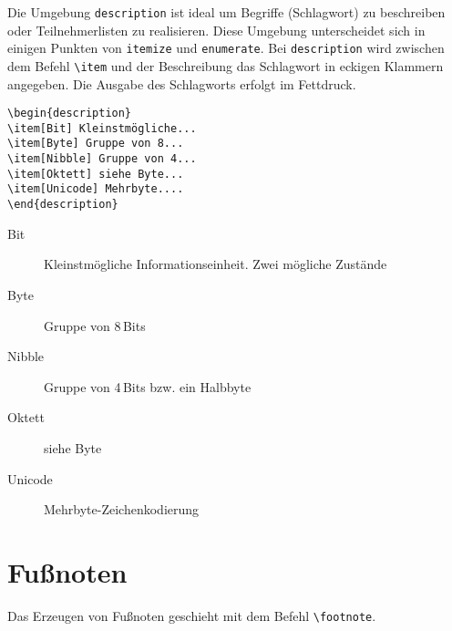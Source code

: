 Die Umgebung \verb!description! ist ideal um Begriffe (Schlagwort) zu beschreiben oder Teilnehmerlisten zu realisieren. Diese Umgebung unterscheidet sich in einigen Punkten von \verb!itemize! und \verb!enumerate!.
Bei \verb!description! wird zwischen dem Befehl \verb!\item! und der Beschreibung das Schlagwort in eckigen Klammern angegeben. Die Ausgabe des Schlagworts erfolgt im Fettdruck. 

\begin{minipage}[h]{0.44\textwidth}
\setlength{\parskip}{1em}
\frenchspacing
\begin{Verbatim}[frame=single]
\begin{description}
\item[Bit] Kleinstmögliche...
\item[Byte] Gruppe von 8...
\item[Nibble] Gruppe von 4...
\item[Oktett] siehe Byte...
\item[Unicode] Mehrbyte....
\end{description}
\end{Verbatim}
\end{minipage}
\hfill
\begin{minipage}[h]{0.54\textwidth}
\setlength{\parskip}{1em}
\frenchspacing
\begin{description}
\item[Bit] Kleinstmögliche Informationseinheit. Zwei mögliche Zustände
\item[Byte] Gruppe von 8\,Bits
\item[Nibble] Gruppe von 4\,Bits bzw. ein Halbbyte
\item[Oktett] siehe Byte
\item[Unicode] Mehrbyte-Zeichenkodierung
\end{description}
\end{minipage}

\section{Fußnoten}

Das Erzeugen von Fußnoten geschieht mit dem Befehl \verb!\footnote!. 


